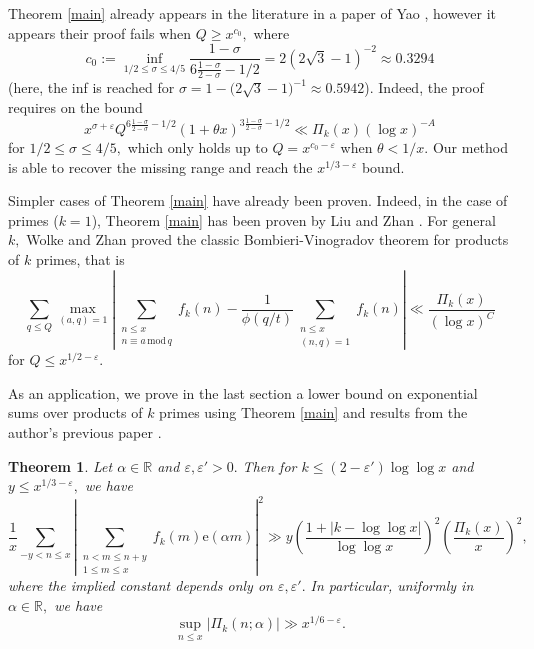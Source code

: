 \documentclass{article}
\newtheorem{theorem}[prop]{Theorem}
\newcommand{\Mod}{\,\mathrm{mod}\,}
\newcommand{\e}{\mathrm{e}}
\newcommand{\R}{\mathds{R}}
\newcommand{\eps}{\varepsilon}
\begin{document}
Theorem \ref{main} already appears in the literature in a paper of Yao \cite{yao}, however it appears their proof fails when $Q \ge x^{c_0},$ where
\begin{equation*}%
    c_0 := \inf_{1/2 \le \sigma \le 4/5} \frac{1-\sigma}{6\frac{1-\sigma}{2-\sigma} - 1/2} = 2\left(2\sqrt{3}-1\right)^{-2} \approx 0.3294
\end{equation*}
(here, the inf is reached for $\sigma = 1 - \big(2\sqrt{3}-1\big)^{-1} \approx 0.5942$).
Indeed, the proof requires on \cite[p. 2008]{yao} the bound \begin{equation}\label{cond29}
        x^{\sigma + \eps} Q^{6\frac{1-\sigma}{2-\sigma} - 1/2} (1+\theta x)^{3\frac{1-\sigma}{2-\sigma} - 1/2} \ll \Pi_k(x)(\log x)^{-A}
\end{equation} for $1/2 \le \sigma \le 4/5,$ which only holds up to $Q = x^{c_0-\eps}$ when $\theta < 1/x.$ Our method is able to recover the missing range and reach the $x^{1/3-\eps}$ bound.

Simpler cases of Theorem \ref{main} have already been proven. Indeed, in the case of primes ($k = 1$), Theorem \ref{main} has been proven by Liu and Zhan \cite[Theorem 3]{liuzhan}. For general $k,$ Wolke and Zhan \cite{wolkezhan} proved the classic Bombieri-Vinogradov theorem for products of $k$ primes, that is
\begin{equation}\label{bv-pik}
    \sum_{q\le Q} \max_{(a,q) = 1} \left|\sum_{\substack{n\le x \\ n \equiv a\Mod q}} f_k(n) -\frac{1}{\phi(q/t)}\sum_{\substack{n\le x \\ (n,q) = 1}} f_k(n) \right| \ll \frac{\Pi_k(x)}{(\log x)^C}
\end{equation}
for $Q\le x^{1/2-\eps}.$

As an application, we prove in the last section a lower bound on exponential sums over products of $k$ primes using Theorem \ref{main} and results from the author's previous paper \cite{self}. 

\begin{theorem}\label{uniform-pik}
    Let $\alpha\in\R$ and $\eps, \eps' > 0.$
    Then for $k \le (2-\eps')\log\log x$ and $y\le x^{1/3 - \eps},$ we have  $$\frac{1}{x} \sum_{-y < n\le x} \left|\sum_{\substack{n< m\le n+y \\ 1 \le m \le x}} f_k(m) \e(\alpha m)\right|^2 \gg y \left(\frac{1 + |k-\log\log x|}{\log\log x}\right)^2 \left(\frac{\Pi_k(x)}{x}\right)^2,$$ where the implied constant depends only on $\eps, \eps'.$ In particular, uniformly in $\alpha\in\R,$ we have
    $$\sup_{n\le x} \big|\Pi_k(n;\alpha)\big| \gg x^{1/6 - \eps}.$$
\end{theorem}
\end{document}
